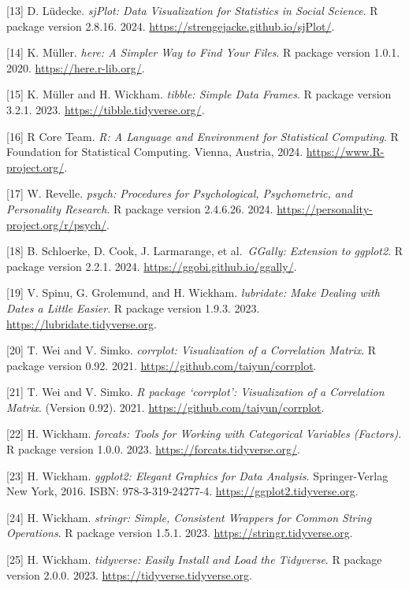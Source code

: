 \documentclass[
  letterpaper,
  DIV=11,
  numbers=noendperiod]{scrreprt}
\begin{document}
{[}13{]} D. Lüdecke. \emph{sjPlot: Data Visualization for Statistics in
Social Science}. R package version 2.8.16. 2024.
\url{https://strengejacke.github.io/sjPlot/}.

{[}14{]} K. Müller. \emph{here: A Simpler Way to Find Your Files}. R
package version 1.0.1. 2020. \url{https://here.r-lib.org/}.

{[}15{]} K. Müller and H. Wickham. \emph{tibble: Simple Data Frames}. R
package version 3.2.1. 2023. \url{https://tibble.tidyverse.org/}.

{[}16{]} R Core Team. \emph{R: A Language and Environment for
Statistical Computing}. R Foundation for Statistical Computing. Vienna,
Austria, 2024. \url{https://www.R-project.org/}.

{[}17{]} W. Revelle. \emph{psych: Procedures for Psychological,
Psychometric, and Personality Research}. R package version 2.4.6.26.
2024. \url{https://personality-project.org/r/psych/}.

{[}18{]} B. Schloerke, D. Cook, J. Larmarange, et al.~\emph{GGally:
Extension to ggplot2}. R package version 2.2.1. 2024.
\url{https://ggobi.github.io/ggally/}.

{[}19{]} V. Spinu, G. Grolemund, and H. Wickham. \emph{lubridate: Make
Dealing with Dates a Little Easier}. R package version 1.9.3. 2023.
\url{https://lubridate.tidyverse.org}.

{[}20{]} T. Wei and V. Simko. \emph{corrplot: Visualization of a
Correlation Matrix}. R package version 0.92. 2021.
\url{https://github.com/taiyun/corrplot}.

{[}21{]} T. Wei and V. Simko. \emph{R package `corrplot': Visualization
of a Correlation Matrix}. (Version 0.92). 2021.
\url{https://github.com/taiyun/corrplot}.

{[}22{]} H. Wickham. \emph{forcats: Tools for Working with Categorical
Variables (Factors)}. R package version 1.0.0. 2023.
\url{https://forcats.tidyverse.org/}.

{[}23{]} H. Wickham. \emph{ggplot2: Elegant Graphics for Data Analysis}.
Springer-Verlag New York, 2016. ISBN: 978-3-319-24277-4.
\url{https://ggplot2.tidyverse.org}.

{[}24{]} H. Wickham. \emph{stringr: Simple, Consistent Wrappers for
Common String Operations}. R package version 1.5.1. 2023.
\url{https://stringr.tidyverse.org}.

{[}25{]} H. Wickham. \emph{tidyverse: Easily Install and Load the
Tidyverse}. R package version 2.0.0. 2023.
\url{https://tidyverse.tidyverse.org}.
\end{document}
